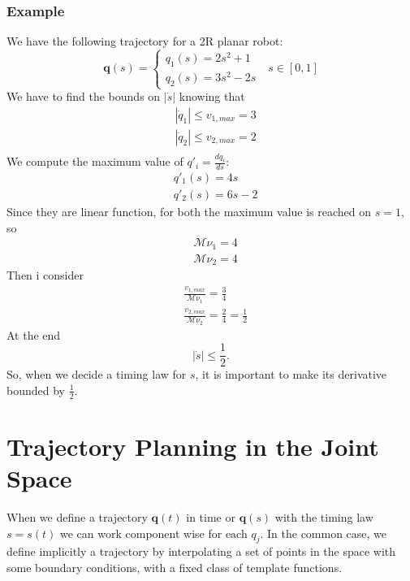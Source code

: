 \documentclass[10pt, letterpaper]{report}
\begin{document}
\subsubsection{Example}
We have the following trajectory for a 2R planar robot:\begin{equation}
    \mathbf q(s)=\begin{cases}
        q_1(s)=2s^2+1\\ 
        q_2(s)=3s^2-2s 
    \end{cases} \ \ \ s\in [0,1]
\end{equation}
We have to find the bounds on $|\dot s|$ knowing that\begin{align}
&|\dot q_1|\le v_{1,max}=3 \\
&|\dot q_2|\le  v_{2,max}=2\\
\end{align}
We compute the maximum value of $q'_i=\frac{dq_i}{ds}$:\begin{align}
    &q'_1(s)=4s\\ 
    &q'_2(s)=6s-2
\end{align}
Since they are linear function, for both the maximum value is reached on $s=1$, so\begin{align}
    &\mathcal{M}\nu_1=4\\
    &\mathcal{M}\nu_2=4
\end{align}
Then i consider\begin{align}
   & \frac{v_{1,max}}{\mathcal{M}\nu_1}=\frac{3}{4}\\
    & \frac{v_{2,max}}{\mathcal{M}\nu_2}=\frac{2}{4}=\frac{1}{2}
\end{align}
At the end\begin{equation}
    |\dot s|\le \frac{1}{2}.
\end{equation}
So, when we decide a timing law for $s$, it is important to make its derivative bounded by $\frac{1}{2}$.
\section{Trajectory Planning in the Joint Space}
When we define a trajectory $\mathbf q(t)$ in time or $\mathbf q(s)$ with the timing law $s=s(t)$ we can work component wise for each $q_j$. In the common case, we define implicitly a trajectory by interpolating a set of points in the space with some boundary conditions, with a fixed class of template functions. 
\end{document}

